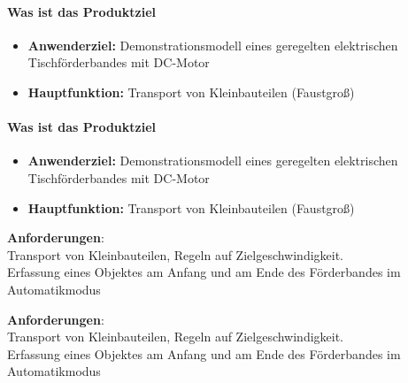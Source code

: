 %
%
%
%




{ 
	
  \framesubtitle{Was ist das Produktziel}	
 

  \begin{itemize}
    \item \textbf{Anwenderziel:} Demonstrationsmodell eines geregelten elektrischen Tischförderbandes mit DC-Motor 
    \item \textbf{Hauptfunktion:} Transport von Kleinbauteilen (Faustgroß)
    
\end{itemize}
}

{ 
	
	\framesubtitle{Was ist das Produktziel}	
	
	
	\begin{itemize}
		\item \textbf{Anwenderziel:} Demonstrationsmodell eines geregelten elektrischen Tischförderbandes mit DC-Motor 
		\item \textbf{Hauptfunktion:} Transport von Kleinbauteilen (Faustgroß)
		
	\end{itemize}
}

{ 
  \textbf{Anforderungen}:\\
  Transport von Kleinbauteilen, Regeln auf Zielgeschwindigkeit.\\ 
  Erfassung  eines Objektes am Anfang und am Ende des Förderbandes im Automatikmodus 

  
} 

{ 
	\textbf{Anforderungen}:\\
	Transport von Kleinbauteilen, Regeln auf Zielgeschwindigkeit.\\ 
	Erfassung  eines Objektes am Anfang und am Ende des Förderbandes im Automatikmodus 
	
} 

